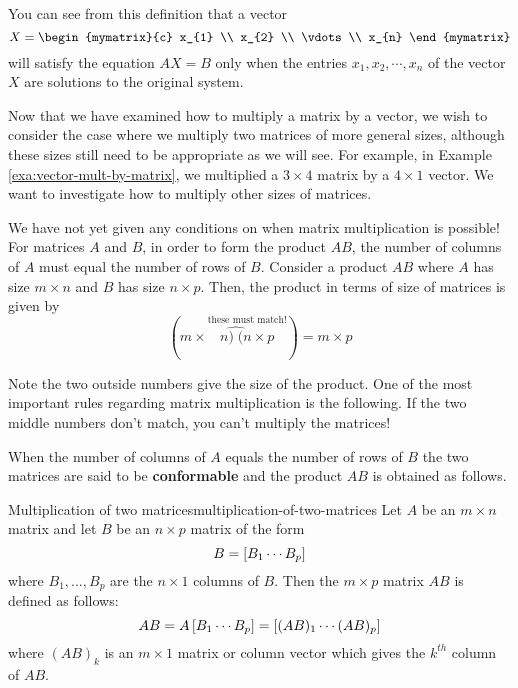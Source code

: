 You can see from this definition that a vector 
\begin{equation*}
X =
\begin{mymatrix}{c}
x_{1} \\
x_{2} \\
\vdots \\
x_{n}
\end{mymatrix}
\end{equation*}
will satisfy the equation $AX=B$
only when the entries $x_{1}, x_{2}, \cdots, x_{n}$ of the vector $X$ are solutions to the original system.

Now that we have examined how to multiply a matrix by a vector, we
wish to consider the case where we multiply two matrices of more
general sizes, although these sizes still need to be appropriate as we
will see. For example, in Example \ref{exa:vector-mult-by-matrix}, we
multiplied a $3 \times 4$ matrix by a $4 \times 1$ vector.  We want to
investigate how to multiply other sizes of matrices.

We have not yet given any conditions on when matrix multiplication is
possible!  For matrices $A$ and $B$, in order to form the product
$AB$, the number of columns of $A$ must equal the number of rows of
$B.$ Consider a product $AB$ where $A$ has size $m\times n$ and $B$
has size $n \times p$. Then, the product in terms of size of matrices
is given by
\begin{equation*}
(m\times\overset{\text{these must match!}}{\widehat{n)\;(n}\times p})=m\times p
\end{equation*}

Note the two outside numbers give the size of the product. One of the most important rules regarding matrix multiplication is the following. 
If the two middle numbers don't match, you can't multiply the
matrices!

When the number of columns of $A$ equals the number of rows
of $B$ the two matrices are said to be
\textbf{conformable} and the product
$AB$  is obtained as follows.

\begin{definition}{Multiplication of two matrices}{multiplication-of-two-matrices}
 Let $A$ be an $m\times n$ matrix
and let $B$ be an $n\times p$ matrix of the form
\begin{equation*}
B=\left[B_{1} \cdots  B_{p}\right]
\end{equation*}
where $B_{1},...,B_{p}$ are the $n\times 1$ columns of $B$. Then the 
$m\times p$ matrix $AB$ is defined as follows:
\begin{equation*}
AB = A \left[B_{1} \cdots  B_{p}\right] =  \left[(A B)_{1} \cdots  (AB)_{p}\right] 
\end{equation*}
where $(AB)_{k}$ is an $m\times 1$ matrix or column vector which
gives the $k^{th}$ column of $AB$. 
\end{definition}

